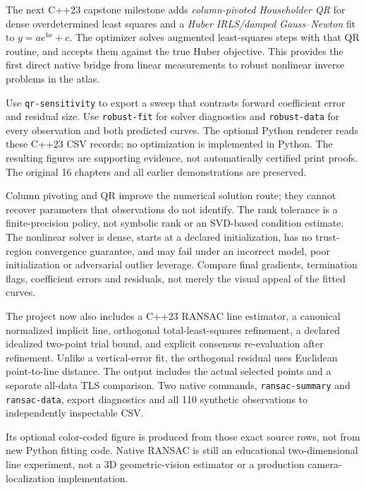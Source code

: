 \begin{booktwoconcept}
The next C++23 capstone milestone adds \emph{column-pivoted
Householder QR} for dense overdetermined least squares
and a \emph{Huber IRLS/damped Gauss--Newton} fit to
\(y=a e^{bx}+c\). The optimizer solves augmented least-squares
steps with that QR routine, and accepts them against the true
Huber objective. This provides the first direct native
bridge from linear measurements to robust nonlinear
inverse problems in the atlas.

Use \texttt{qr-sensitivity} to export a sweep that contrasts
forward coefficient error and residual size.
Use \texttt{robust-fit} for solver diagnostics and
\texttt{robust-data} for every observation and both predicted
curves. The optional Python renderer reads these C++23 CSV
records; no optimization is implemented in Python.
The resulting figures are supporting evidence,
not automatically certified print proofs. The original
16 chapters and all earlier demonstrations are preserved.
\end{booktwoconcept}

\begin{booktwopitfall}
Column pivoting and QR improve the numerical solution route;
they cannot recover parameters that observations do not
identify. The rank tolerance is a finite-precision policy,
not symbolic rank or an SVD-based condition estimate.
The nonlinear solver is dense, starts at a declared
initialization, has no trust-region convergence guarantee,
and may fail under an incorrect model, poor initialization
or adversarial outlier leverage. Compare final gradients,
termination flags, coefficient errors and residuals,
not merely the visual appeal of the fitted curves.
\end{booktwopitfall}


\begin{booktwoconcept}
The project now also includes a C++23 RANSAC line
estimator, a canonical normalized implicit line,
orthogonal total-least-squares refinement, a
declared idealized two-point trial bound, and
explicit consensus re-evaluation after refinement.
Unlike a vertical-error fit, the orthogonal residual
uses Euclidean point-to-line distance. The output
includes the actual selected points and a separate
all-data TLS comparison. Two native commands,
\texttt{ransac-summary} and \texttt{ransac-data},
export diagnostics and all 110 synthetic observations
to independently inspectable CSV.

Its optional color-coded figure is produced from
those exact source rows, not from new Python fitting
code. Native RANSAC is still an educational two-dimensional
line experiment, not a 3D geometric-vision estimator
or a production camera-localization implementation.
\end{booktwoconcept}


